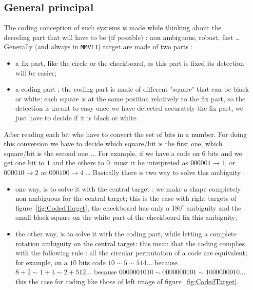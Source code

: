 \subsection{General principal}

The coding conception of such systems is made while thinking
about the decoding part  that will have to be (if possible) : non ambiguous,
robust, fast \dots   Generally (and always in {\tt MMVII})  target are made of two parts :

\begin{itemize}
    \item a fix part, like the circle or the checkboard,  as this part is fixed
         its detection will be easier;

    \item a coding part ; the coding part is made  of different "square" that can be black or white;
	  each square is at the same position relatively to the fix part, so the detection is  meant to 
          easy once we have  detected accurately the fix part, we just have  to decide if it is black or white.
\end{itemize}

After reading  each bit  whe have to  convert  the set of bits in a number.  For
doing this conversion we have to decide which square/bit is the first one,
which square/bit is the second one ... For example, if we have a code on 
$6$ bits and we get  one bit to $1$ and the others to $0$, must it be
interpreted as $000001 \rightarrow 1$,  or $000010 \rightarrow 2$ or $000100 \rightarrow 4$ \dots
Basically there is two way to solve this ambiguity :

\begin{itemize}
     \item one way, is to solve it with the central target : we 
	     make a shape completely non ambiguous for the central target;
	     this is the case with right targets of figure~\ref{fig:CodedTarget}, the checkboard
             has only a $180^{\circ} $ ambiguity  and the small black square  on the white
	     part of the checkboard fix this ambiguity;

     \item the other way, is to solve it with the coding part, while letting a complete rotation ambiguity
	     on the central target: this mean that the  coding complies with the following rule :
             all the circular permutation of a code are equivalent;  for example,
             on a $10$ bits code $ 10 \sim  5 \sim 514 \dots$ because $8+2\sim 1+4 \sim  2+512 \dots$
	     because  $0000001010 \sim 0000000101 \sim  1000000010 \dots$
	     this the case for coding  like those of left image of figure~\ref{fig:CodedTarget}.
\end{itemize}


